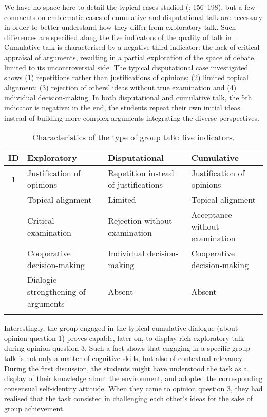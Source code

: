 \documentclass[output=paper]{langscibook}
\begin{document}
We have no space here to detail the typical cases studied (\citealt{Polo2014}: 156--198), but a few comments on emblematic cases of cumulative and disputational talk are necessary in order to better understand how they differ from exploratory talk. Such differences are specified along the five indicators of the quality of talk in . Cumulative talk is characterised by a negative third indicator: the lack of critical appraisal of arguments, resulting in a partial exploration of the space of debate, limited to its uncontroversial side. The typical disputational case investigated shows
(1) repetitions rather than justifications of opinions;
(2) limited topical alignment;
(3) rejection of others’ ideas without true examination and
(4) individual decision-making. In both disputational and cumulative talk, the 5th indicator is negative: in the end, the students repeat their own initial ideas instead of building more complex arguments integrating the diverse perspectives.


\begin{table}
\caption{Characteristics of the type of group talk: five indicators.\label{tab:11:2}}

\begin{tabularx}{\textwidth}{cQQQ}

\lsptoprule

 ID & Exploratory & Disputational & Cumulative\\
 
 \midrule
 
 1 & Justification of opinions & Repetition instead of justifications & Justification of opinions\\ & Topical alignment & Limited & Topical alignment\\ & Critical examination & Rejection without examination & Acceptance without examination\\ & Cooperative decision-making & Individual decision-making & Cooperative decision-making\\ & Dialogic strengthening of arguments & Absent & Absent\\
\lspbottomrule

\end{tabularx}
\end{table}

Interestingly, the group engaged in the typical cumulative dialogue (about opinion question 1) proves capable, later on, to display rich exploratory talk during opinion question 3. Such a fact shows that engaging in a specific group talk is not only a matter of cognitive skills, but also of contextual relevancy. During the first discussion, the students might have understood the task as a display of their knowledge about the environment, and adopted the corresponding consensual self-identity attitude. When they came to opinion question 3, they had realised that the task consisted in challenging each other’s ideas for the sake of group achievement. 
\end{document}
